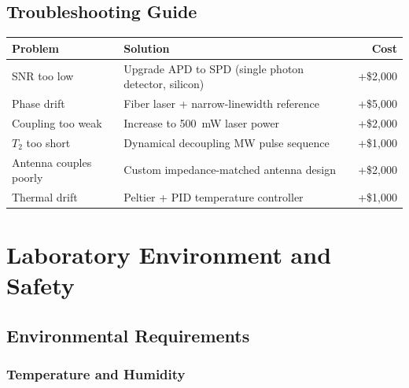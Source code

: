\documentclass[11pt,a4paper,openany]{book}
\begin{document}
\section{Troubleshooting Guide}

\begin{center}
\begin{tabularx}{\textwidth}{|l|X|r|}
\hline
\textbf{Problem} & \textbf{Solution} & \textbf{Cost} \\
\hline
SNR too low & Upgrade APD to SPD (single photon detector, silicon) & +\$2,000 \\
\hline
Phase drift & Fiber laser + narrow-linewidth reference & +\$5,000 \\
\hline
Coupling too weak & Increase to 500~mW laser power & +\$2,000 \\
\hline
$T_2$ too short & Dynamical decoupling MW pulse sequence & +\$1,000 \\
\hline
Antenna couples poorly & Custom impedance-matched antenna design & +\$2,000 \\
\hline
Thermal drift & Peltier + PID temperature controller & +\$1,000 \\
\hline
\end{tabularx}
\end{center}




\chapter{Laboratory Environment and Safety}\label{ch:safety}


\section{Environmental Requirements}

\subsection{Temperature and Humidity}
\end{document}
